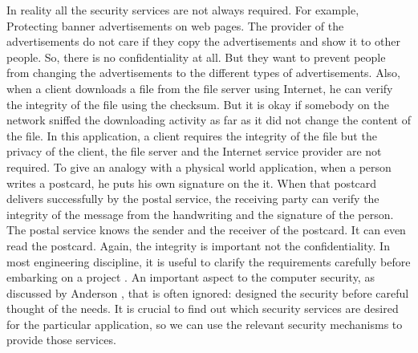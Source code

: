	In reality all the security services are not always required.
	For example, Protecting banner advertisements on web pages. 
	The provider of the advertisements do not care if they copy the advertisements and show it to other people.
	So, there is no confidentiality at all.
	But they want to prevent people from changing the advertisements to the different types of advertisements.
	Also, when a client downloads a file from the file server using Internet, he can verify the integrity of the file using the checksum.
	But it is okay if somebody on the network sniffed the downloading activity as far as it did not change the content of the file.
	In this application, a client requires the integrity of the file but the privacy of the client, the file server and the Internet service provider are not required.
	To give an analogy with a physical world application, when a person writes a postcard, he puts his own signature on the it. 
	When that postcard delivers successfully by the postal service, the receiving party can verify the integrity of the message from the handwriting and the signature of the person.
	The postal service knows the sender and the receiver of the postcard.
	It can even read the postcard.
	Again, the integrity is important not the confidentiality.
	In most engineering discipline, it is useful to clarify the requirements carefully before embarking on a project \cite{2002-Stajano-ubiquitous}.
	An important aspect to the computer security, as discussed by Anderson \cite{anderson1993cryptosystems}, that is often ignored: designed the security before careful thought of the needs.
 	It is crucial to find out which security services are desired for the particular application, so we can use the relevant security mechanisms to provide those services.
	


